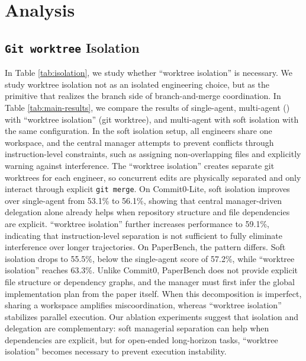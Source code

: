 \section{Analysis}
\label{sec:analysis}
\subsection{\texttt{Git worktree} Isolation}

In Table \ref{tab:isolation}, we study whether ``worktree isolation'' is necessary. 
We study worktree isolation not as an isolated engineering choice, but as the primitive that realizes the branch side of branch-and-merge coordination. In Table \ref{tab:main-results}, we compare the results of single-agent, multi-agent (\ourmethod) with ``worktree isolation'' (git worktree), and multi-agent with soft isolation with the same configuration. In the soft isolation setup, all engineers share one workspace, and the central manager attempts to prevent conflicts through instruction-level constraints, such as assigning non-overlapping files and explicitly warning against interference. The ``worktree isolation'' creates separate git worktrees for each engineer, so concurrent edits are physically separated and only interact through explicit \texttt{git merge}. On Commit0-Lite, soft isolation improves over single-agent from 53.1\% to 56.1\%, showing that central manager-driven delegation alone already helps when repository structure and file dependencies are explicit. ``worktree isolation'' further increases performance to 59.1\%, indicating that instruction-level separation is not sufficient to fully eliminate interference over longer trajectories. On PaperBench, the pattern differs. Soft isolation drops to 55.5\%, below the single-agent score of 57.2\%, while ``worktree isolation'' reaches 63.3\%. Unlike Commit0, PaperBench does not provide explicit file structure or dependency graphs, and the manager must first infer the global implementation plan from the paper itself. When this decomposition is imperfect, sharing a workspace amplifies miscoordination, whereas ``worktree isolation'' stabilizes parallel execution. Our ablation experiments suggest that isolation and delegation are complementary: soft managerial separation can help when dependencies are explicit, but for open-ended long-horizon tasks, ``worktree isolation'' becomes necessary to prevent execution instability.


